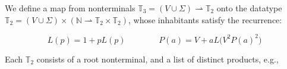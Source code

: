 \documentclass[portrait,a0b,final,a4resizeable]{a0poster}
\def\jointspacing{\vspace{0.3in}}
\begin{document}
\begin{poster}
\begin{multicols}{2}
      \jointspacing

      \pagebreak      {}

      \jointspacing

      \hspace*{2cm}\begin{minipage}[c]{0.90\columnwidth}
      We define a map from nonterminals $\mathbb{T}_3 = (V \cup \Sigma) \rightharpoonup \mathbb{T}_2$ onto the datatype $\mathbb{T}_2 = (V \cup \Sigma) \times (\mathbb{N} \rightharpoonup \mathbb{T}_2\times\mathbb{T}_2)$, whose inhabitants satisfy the recurrence:
      \end{minipage}

      \begin{equation*}
        L(p) = 1 + p L(p) \phantom{addspace} P(a) = V + a L\big(V^2P(a)^2\big)
      \end{equation*}

      \hspace*{2cm}\begin{minipage}[c]{0.90\columnwidth}
        Each $\mathbb{T}_2$ consists of a root nonterminal, and a list of distinct products, e.g.,
      \end{minipage}

      \jointspacing


\end{multicols}
\end{poster}
\end{document}
